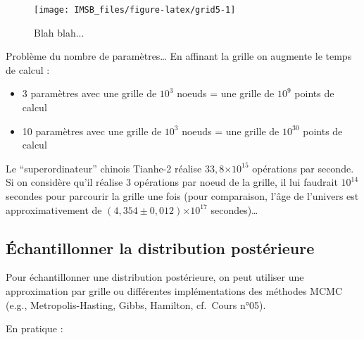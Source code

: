 \documentclass[
  a4paper,11pt,twoside,onecolumn,openright,final,oldfontcommands]{memoir}
\providecommand{\tightlist}{%
  \setlength{\itemsep}{0pt}\setlength{\parskip}{0pt}}
\theoremstyle{definition}
\theoremstyle{definition}
\theoremstyle{definition}
\theoremstyle{definition}
\theoremstyle{remark}
\begin{document}
\begin{figure}[!htb]

{\centering \texttt{[image: IMSB\_files/figure-latex/grid5-1]} 

}

\caption{Blah blah...}\label{fig:grid5}
\end{figure}

Problème du nombre de paramètres\ldots{} En affinant la grille on augmente le temps de calcul :

\begin{itemize}
\tightlist
\item
  3 paramètres avec une grille de \(10^3\) noeuds = une grille de \(10^9\) points de calcul
\item
  10 paramètres avec une grille de \(10^3\) noeuds = une grille de \(10^{30}\) points de calcul
\end{itemize}

Le ``superordinateur'' chinois Tianhe-2 réalise \(33,8 \text{×} 10^{15}\) opérations par seconde. Si on considère qu'il réalise 3 opérations par noeud de la grille, il lui faudrait \(10^{14}\) secondes pour parcourir la grille une fois (pour comparaison, l'âge de l'univers est approximativement de \((4,354 ± 0,012)\text{×}10^{17}\) secondes)\ldots{}

\hypertarget{uxe9chantillonner-la-distribution-postuxe9rieure}{%
\subsection{Échantillonner la distribution postérieure}\label{uxe9chantillonner-la-distribution-postuxe9rieure}}

Pour échantillonner une distribution postérieure, on peut utiliser une approximation par grille ou différentes implémentations des méthodes MCMC (e.g., Metropolis-Hasting, Gibbs, Hamilton, cf.~Cours n°05).

En pratique :
\end{document}
